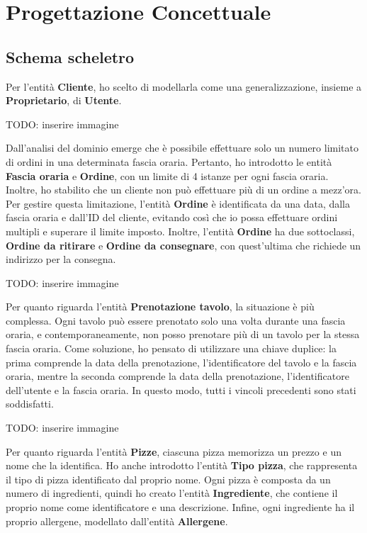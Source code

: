 \documentclass[a4paper,12pt, oneside]{article}
\begin{document}
\section{Progettazione Concettuale}
\subsection{Schema scheletro}

Per l'entità \textbf{Cliente}, ho scelto di modellarla come una
generalizzazione, insieme a \textbf{Proprietario}, di \textbf{Utente}.

TODO: inserire immagine

Dall'analisi del dominio emerge che è possibile effettuare solo un
numero limitato di ordini in una determinata fascia oraria. Pertanto,
ho introdotto le entità \textbf{Fascia oraria} e \textbf{Ordine},
con un limite di 4 istanze per ogni fascia oraria. Inoltre, ho
stabilito che un cliente non può effettuare più di un ordine a mezz'ora.
Per gestire questa limitazione, l'entità \textbf{Ordine} è
identificata da una data, dalla fascia oraria e dall'ID del cliente,
evitando così che io possa effettuare ordini multipli e superare il
limite imposto. Inoltre, l'entità \textbf{Ordine} ha due sottoclassi,
\textbf{Ordine da ritirare} e \textbf{Ordine da consegnare}, con
quest'ultima che richiede un indirizzo per la consegna.

TODO: inserire immagine

Per quanto riguarda l'entità \textbf{Prenotazione tavolo}, la
situazione è più complessa. Ogni tavolo può essere prenotato solo una
volta durante una fascia oraria, e contemporaneamente, non posso
prenotare più di un tavolo per la stessa fascia oraria. Come soluzione,
ho pensato di utilizzare una chiave duplice: la prima comprende la data
della prenotazione, l'identificatore del tavolo e la fascia oraria,
mentre la seconda comprende la data della prenotazione,
l'identificatore dell'utente e la fascia oraria. In questo modo, tutti
i vincoli precedenti sono stati soddisfatti.

TODO: inserire immagine

Per quanto riguarda l'entità \textbf{Pizze}, ciascuna pizza memorizza
un prezzo e un nome che la identifica. Ho anche introdotto l'entità
\textbf{Tipo pizza}, che rappresenta il tipo di pizza identificato dal
proprio nome. Ogni pizza è composta da un numero di ingredienti, quindi
ho creato l'entità \textbf{Ingrediente}, che contiene il proprio nome
come identificatore e una descrizione. Infine, ogni ingrediente ha il
proprio allergene, modellato dall'entità \textbf{Allergene}.
\end{document}

